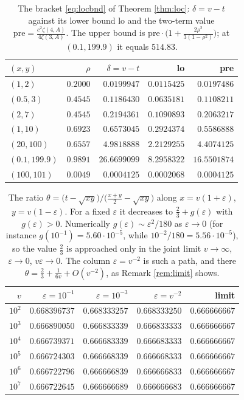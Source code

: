 \documentclass[11pt,a4paper]{amsart}
\theoremstyle{definition}
\newcommand{\eps}{\varepsilon}
\begin{document}
\begin{table}[htbp]\centering\small
\caption{The bracket \eqref{eq:locbnd} of Theorem \ref{thm:loc}: $\delta=v-t$ against its
lower bound $\mathrm{lo}$ and the two-term value
$\mathrm{pre}=\frac{c^{2}\zeta(4,A)}{4\zeta(3,A)}$. The upper bound is
$\mathrm{pre}\cdot\big(1+\frac{2\rho^{2}}{3(1-\rho^{2})}\big)$; at $(0.1,199.9)$ it equals
$514.83$.}
\label{tab:brk}
\begin{tabular}{lrrrr}
\toprule
$(x,y)$ & $\rho$ & $\delta=v-t$ & lo & pre\\
\midrule
$(1,2)$ & $0.2000$ & $0.0199947$ & $0.0115425$ & $0.0197486$\\
$(0.5,3)$ & $0.4545$ & $0.1186430$ & $0.0635181$ & $0.1108211$\\
$(2,7)$ & $0.4545$ & $0.2194361$ & $0.1090893$ & $0.2063217$\\
$(1,10)$ & $0.6923$ & $0.6573045$ & $0.2924374$ & $0.5586888$\\
$(20,100)$ & $0.6557$ & $4.9818888$ & $2.2129255$ & $4.4074125$\\
$(0.1,199.9)$ & $0.9891$ & $26.6699099$ & $8.2958322$ & $16.5501874$\\
$(100,101)$ & $0.0049$ & $0.0004125$ & $0.0002068$ & $0.0004125$\\
\bottomrule
\end{tabular}
\end{table}

\begin{table}[htbp]\centering\small
\caption{The ratio $\theta=\big(t-\sqrt{xy}\big)/\big(\frac{x+y}{2}-\sqrt{xy}\big)$ along
$x=v(1+\eps)$, $y=v(1-\eps)$. For a fixed $\eps$ it decreases to
$\frac23+g(\eps)$ with $g(\eps)>0$. Numerically $g(\eps)\sim\eps^{2}/180$ as $\eps\to0$
(for instance $g(10^{-1})=5.60\cdot10^{-5}$, while $10^{-2}/180=5.56\cdot10^{-5}$), so the
value $\frac23$ is approached only in the joint limit $v\to\infty$, $\eps\to0$,
$v\eps\to0$. The column $\eps=v^{-2}$ is such a path, and there
$\theta=\frac23+\frac{1}{6v}+O(v^{-2})$, as Remark \ref{rem:limit} shows.}
\label{tab:inf}
\begin{tabular}{rrrrr}
\toprule
$v$ & $\eps=10^{-1}$ & $\eps=10^{-3}$ & $\eps=v^{-2}$ & limit\\
\midrule
$10^{2}$ & $0.668396737$ & $0.668333257$ & $0.668333250$ & $0.666666667$\\
$10^{3}$ & $0.666890050$ & $0.666833339$ & $0.666833333$ & $0.666666667$\\
$10^{4}$ & $0.666739371$ & $0.666683339$ & $0.666683333$ & $0.666666667$\\
$10^{5}$ & $0.666724303$ & $0.666668339$ & $0.666668333$ & $0.666666667$\\
$10^{6}$ & $0.666722796$ & $0.666666839$ & $0.666666833$ & $0.666666667$\\
$10^{7}$ & $0.666722645$ & $0.666666689$ & $0.666666683$ & $0.666666667$\\
\bottomrule
\end{tabular}
\end{table}
\end{document}

